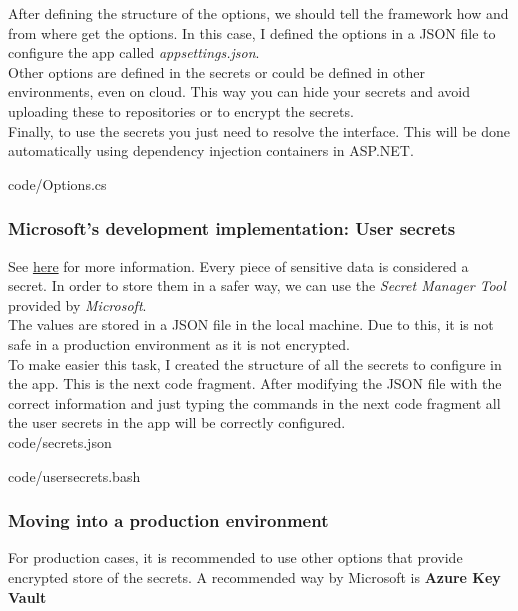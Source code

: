         After defining the structure of the options, we should tell the framework how and from where get the options. In this case, I defined the options in a JSON file to configure the app called \textit{appsettings.json}. \\
        Other options are defined in the secrets or could be defined in other environments, even on cloud. This way you can hide your secrets and avoid uploading these to repositories or to encrypt the secrets. \\

        Finally, to use the secrets you just need to resolve the interface. This will be done automatically using dependency injection containers in ASP.NET.
            
            {code/Options.cs}
        \subsubsection{Microsoft's development implementation: User secrets}
        See \href{https://docs.microsoft.com/en-us/aspnet/core/security/app-secrets?view=aspnetcore-5.0&tabs=windows}{here} for more information. Every piece of sensitive data is considered a secret. In order to store them in a safer way, we can use the \textit{Secret Manager Tool} provided by \textit{Microsoft}. \\
        The values are stored in a JSON file in the local machine. Due to this, it is not safe in a production environment as it is not encrypted. \\
        To make easier this task, I created the structure of all the secrets to configure in the app. This is the next code fragment. After modifying the JSON file with the correct information and just typing the commands in the next code fragment all the user secrets in the app will be correctly configured. \\

        
        {code/secrets.json}

        
        {code/usersecrets.bash}

        \subsubsection{Moving into a production environment}
        For production cases, it is recommended to use other options that provide encrypted store of the secrets. A recommended way by Microsoft is \textbf{Azure Key Vault} \cite{AKV}

